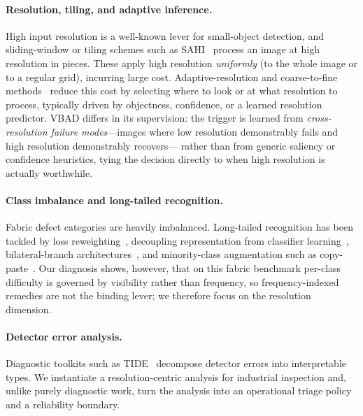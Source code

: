 \paragraph{Resolution, tiling, and adaptive inference.}
High input resolution is a well-known lever for small-object detection, and
sliding-window or tiling schemes such as SAHI~\cite{sahi} process an image at high
resolution in pieces. These apply high resolution \emph{uniformly} (to the whole
image or to a regular grid), incurring large cost. Adaptive-resolution and
coarse-to-fine methods~\cite{ranet,drnet,dynamiczoom} reduce this cost by
selecting where to look or at what resolution to process, typically driven by
objectness, confidence, or a learned resolution predictor. VBAD differs in its supervision:
the trigger is learned from \emph{cross-resolution failure modes}---images where
low resolution demonstrably fails and high resolution demonstrably recovers---
rather than from generic saliency or confidence heuristics, tying the decision
directly to when high resolution is actually worthwhile.

\paragraph{Class imbalance and long-tailed recognition.}
Fabric defect categories are heavily imbalanced. Long-tailed recognition has
been tackled by loss reweighting~\cite{eql,focalloss}, decoupling
representation from classifier learning~\cite{decoupling}, bilateral-branch
architectures~\cite{bbn}, and minority-class augmentation such as
copy-paste~\cite{copypaste}. Our diagnosis shows, however, that on this fabric
benchmark per-class difficulty is governed by visibility rather than frequency,
so frequency-indexed remedies are not the binding lever; we therefore focus on
the resolution dimension.

\paragraph{Detector error analysis.}
Diagnostic toolkits such as TIDE~\cite{errortaxonomy} decompose detector errors
into interpretable types. We instantiate a resolution-centric analysis for
industrial inspection and, unlike purely diagnostic work, turn the analysis into
an operational triage policy and a reliability boundary.
